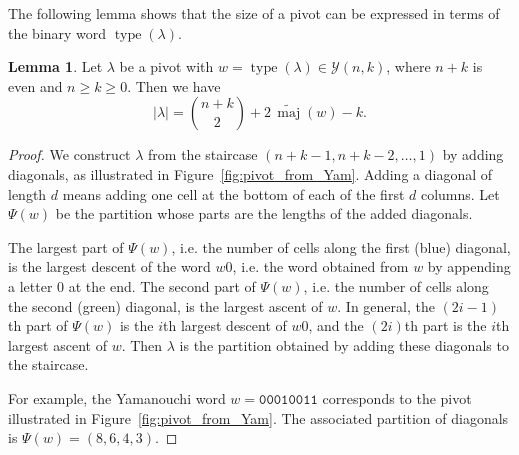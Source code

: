 \documentclass[11pt]{article}
\theoremstyle{definition}
\newtheorem{lemma}[theorem]{Lemma}
\theoremstyle{remark}
\theoremstyle{definition}
\numberwithin{equation}{section}
\newcommand{\type}{\operatorname{type}}
\begin{document}
The following lemma shows that the size of a pivot can be expressed
in terms of the binary word \( \type(\lambda) \).

\begin{lemma}\label{lem:wt_pivot}
  Let \( \lambda \) be a pivot with
  \( w = \type(\lambda) \in \mathcal{Y}(n,k) \), where \( n+k \) is
  even and \( n \geq k \geq 0 \). Then we have
  \[
    |\lambda| = \binom{n+k}{2} + 2\, \widetilde{\operatorname{maj}}(w) -k.
  \]
\end{lemma}

\begin{proof}
  We construct \( \lambda \) from the staircase
  \( (n+k-1, n+k-2, \ldots, 1) \) by adding diagonals, as illustrated
  in Figure~\ref{fig:pivot_from_Yam}. Adding a diagonal of length
  \( d \) means adding one cell at the bottom of each of the first
  \( d \) columns. Let \( \Psi(w) \) be the partition whose parts are
  the lengths of the added diagonals.

  The largest part of \( \Psi(w) \), i.e. the number of cells along
  the first (blue) diagonal, is the largest descent of the word $w0$,
  i.e. the word obtained from $w$ by appending a letter $0$ at the
  end. The second part of $\Psi(w)$, i.e. the number of cells along
  the second (green) diagonal, is the largest ascent of $w$. In
  general, the $(2i-1)$th part of $\Psi(w)$ is the $i$th largest
  descent of $w0$, and the $(2i)$th part is the $i$th largest ascent
  of $w$. Then \( \lambda \) is the partition obtained by adding these
  diagonals to the staircase.

  For example, the Yamanouchi word $w = \texttt{00010011}$ corresponds
  to the pivot illustrated in Figure~\ref{fig:pivot_from_Yam}. The
  associated partition of diagonals is $\Psi(w) = (8,6,4,3)$.


\end{proof}
\end{document}
